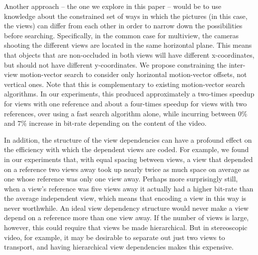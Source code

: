 \documentclass{sig-alternate-05-2015}
\begin{document}
Another approach -- the one we explore in this paper -- would be to use
knowledge about the constrained set of ways in which the pictures (in this
case, the views) can differ from each other in order to narrow down the
possibilities before searching. Specifically, in the common case for
multiview, the cameras shooting the different views are located in the same
horizontal plane. This means that objects that are non-occluded in both
views will have different x-coordinates, but should not have different
y-coordinates. We propose constraining the inter-view motion-vector search to
consider only horizontal motion-vector offsets, not vertical ones. Note that
this is complementary to existing motion-vector search algorithms. In our
experiments, this produced approximately a two-times speedup for views with
one reference and about a four-times speedup for views with two references,
over using a fast search algorithm alone, while incurring between $0\%$ and
$7\%$ increase in bit-rate depending on the content of the video.

In addition, the structure of the view dependencies can have a profound effect
on the efficiency with which the dependent views are coded. For example, we
found in our experiments that, with equal spacing between views, a view that
depended on a reference two views away took up nearly twice as much space on
average as one whose reference was only one view away. Perhaps more
surprisingly still, when a view's reference was five views away it actually
had a higher bit-rate than the average independent view, which means that
encoding a view in this way is never worthwhile. An ideal view dependency
structure would never make a view depend on a reference more than one view
away. If the number of views is large, however, this could require that views
be made hierarchical. But in stereoscopic video, for example, it may be
desirable to separate out just two views to transport, and having hierarchical
view dependencies makes this expensive.
\end{document}
